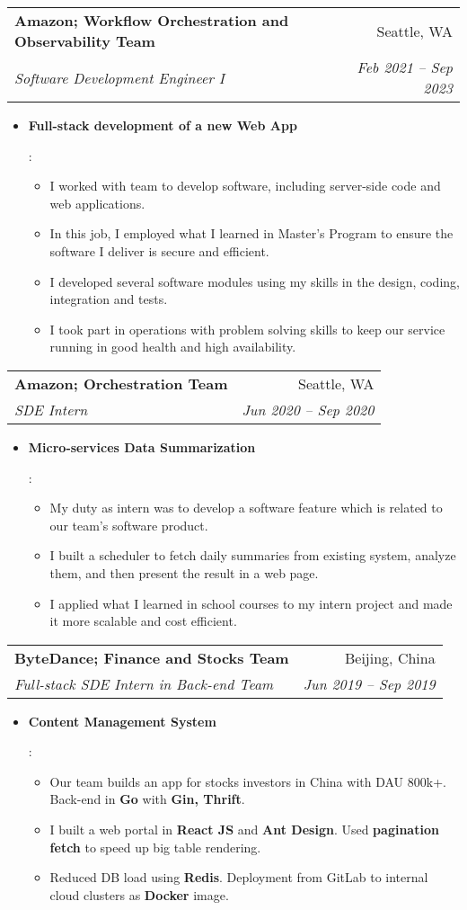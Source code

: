 \documentclass[letterpaper,11pt]{article}
\makeatletter
\newcommand{\resumeItem}[2]{
  \item\small{
    \textbf{#1}{: #2 \vspace{-2pt}}
  }
}
\newcommand{\resumeSubheading}[4]{
  \vspace{-1pt}\item
    \begin{tabular*}{0.97\textwidth}[t]{l@{\extracolsep{\fill}}r}
      \textbf{#1} & #2 \\
      \textit{\small#3} & \textit{\small #4} \\
    \end{tabular*}\vspace{-5pt}
}
\newcommand{\resumeItemListStart}{\begin{itemize}}
\newcommand{\resumeItemListEnd}{\end{itemize}\vspace{-5pt}}
\makeatother
\begin{document}
    \resumeSubheading
      {Amazon; Workflow Orchestration and Observability Team}{Seattle, WA}
      {Software Development Engineer I}{Feb 2021 -- Sep 2023}
      \resumeItemListStart
        \resumeItem{Full-stack development of a new Web App}{
          \begin{itemize}
            \item I worked with team to develop software, including server-side code and web applications.
            \item In this job, I employed what I learned in Master's Program to ensure the software I deliver is secure and efficient.
            \item I developed several software modules using my skills in the design, coding, integration and tests.
            \item I took part in operations with problem solving skills to keep our service running in good health and high availability.
          \end{itemize}
        }
      \resumeItemListEnd

    \resumeSubheading
      {Amazon; Orchestration Team}{Seattle, WA}
      {SDE Intern}{Jun 2020 -- Sep 2020}
      \resumeItemListStart
        \resumeItem{Micro-services Data Summarization}{
          \begin{itemize}
            \item My duty as intern was to develop a software feature which is related to our team's software product.
            \item I built a scheduler to fetch daily summaries from existing system, analyze them, and then present the result in a web page.
            \item I applied what I learned in school courses to my intern project and made it more scalable and cost efficient.
          \end{itemize}
        }
      \resumeItemListEnd

    \resumeSubheading
      {ByteDance; Finance and Stocks Team}{Beijing, China}
      {Full-stack SDE Intern in Back-end Team}{Jun 2019 -- Sep 2019}
      \resumeItemListStart
        \resumeItem{Content Management System}{
          \begin{itemize}
            \item Our team builds an app for stocks investors in China with DAU 800k+. Back-end in \textbf{Go} with \textbf{Gin, Thrift}.
            \item I built a web portal in \textbf{React JS} and \textbf{Ant Design}. Used \textbf{pagination fetch} to speed up big table rendering.
            \item Reduced DB load using \textbf{Redis}. Deployment from GitLab to internal cloud clusters as \textbf{Docker} image.
          \end{itemize}
        }
      \resumeItemListEnd
\end{document}
